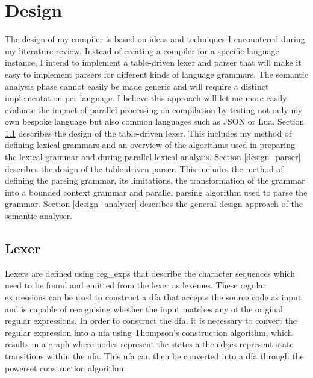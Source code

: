 \chapter{Design} \label{design}

The design of my compiler is based on ideas and techniques I encountered during
my literature review. Instead of creating a compiler for a specific language
instance, I intend to implement a table-driven lexer and parser that will
make it easy to implement parsers for different kinds of language grammars.
The semantic analysis phase cannot easily be made generic and will require a
distinct implementation per language. I believe this approach will let me more
easily evaluate the impact of parallel processing on compilation by testing not
only my own bespoke language but also common languages such as JSON or Lua.
\newline\newline
Section \ref{design_lexer} describes the design of the table-driven lexer.
This includes my method of defining lexical grammars and an overview of the
algorithms used in preparing the lexical grammar and during parallel lexical
analysis.
\newline\newline
Section \ref{design_parser} describes the design of the table-driven parser.
This includes the method of defining the parsing grammar, its limitations,
the transformation of the grammar into a bounded context grammar and parallel
parsing algorithm used to parse the grammar.
\newline\newline
Section \ref{design_analyser} describes the general design approach of the
semantic analyser.

\section{Lexer} \label{design_lexer}

Lexers are defined using \glspl{reg_exp}
that describe the character sequences which need to be found and emitted from
the lexer as lexemes. These regular expressions can be used to construct a
\gls{dfa} that accepts the source code as input and is capable of recognising
whether the input matches any of the original regular expressions. In order to
construct the \gls{dfa}, it is necessary to convert the regular expression into
a \gls{nfa} using Thompson's construction algorithm, which results in a graph
where nodes represent the states a the edges represent state transitions within
the \gls{nfa}. This \gls{nfa} can then be converted into a \gls{dfa} through the
powerset construction algorithm.

